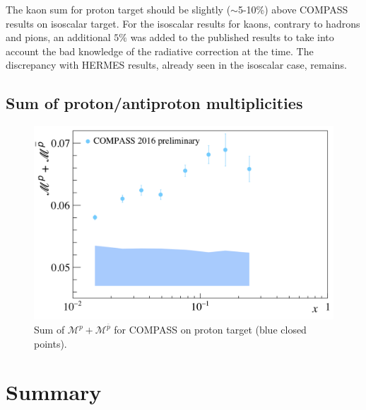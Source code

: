 The kaon sum for proton target should be slightly ($\sim$5-10\%) above COMPASS results on isoscalar target. For the isoscalar results for kaons, contrary to hadrons and pions, an additional $5\%$ was added to the published results to take into account the bad knowledge of the radiative correction at the time. The discrepancy with HERMES results, already seen in the isoscalar case, remains.

\subsection{Sum of proton/antiproton multiplicities}

\begin{figure}[!h]
  \centering
	\includegraphics[scale=0.5]{./gfx/ps.png}
	\caption{Sum of $\mathscr{M}^{p}+\mathscr{M}^{\overline{p}}$ for COMPASS on proton target (blue closed points).}
	\label{pic:psum}
\end{figure}

\section{Summary}
